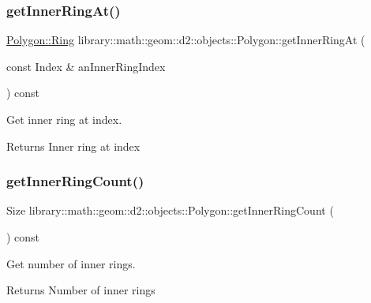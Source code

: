 \subsubsection{\texorpdfstring{get\+Inner\+Ring\+At()}{getInnerRingAt()}}
{\footnotesize\ttfamily \hyperlink{classlibrary_1_1math_1_1geom_1_1d2_1_1objects_1_1_polygon_aa543e7078b73e1d307ca8317d765cd9c}{Polygon\+::\+Ring} library\+::math\+::geom\+::d2\+::objects\+::\+Polygon\+::get\+Inner\+Ring\+At (\begin{DoxyParamCaption}\item[{const Index \&}]{an\+Inner\+Ring\+Index }\end{DoxyParamCaption}) const}



Get inner ring at index. 

\begin{DoxyReturn}{Returns}
Inner ring at index 
\end{DoxyReturn}
\mbox{\label{classlibrary_1_1math_1_1geom_1_1d2_1_1objects_1_1_polygon_a20d245deda49667f0418591d7772d53d}} 
\subsubsection{\texorpdfstring{get\+Inner\+Ring\+Count()}{getInnerRingCount()}}
{\footnotesize\ttfamily Size library\+::math\+::geom\+::d2\+::objects\+::\+Polygon\+::get\+Inner\+Ring\+Count (\begin{DoxyParamCaption}{ }\end{DoxyParamCaption}) const}



Get number of inner rings. 

\begin{DoxyReturn}{Returns}
Number of inner rings 
\end{DoxyReturn}
\mbox{\label{classlibrary_1_1math_1_1geom_1_1d2_1_1objects_1_1_polygon_a3074bceaa8841e79c843d46377195a0d}} 
